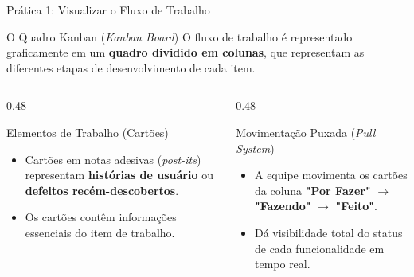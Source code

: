 \documentclass[aspectratio=169, 9pt]{beamer}
\begin{document}
\begin{frame}{Prática 1: Visualizar o Fluxo de Trabalho}
  \begin{block}{O Quadro Kanban (\textit{Kanban Board})}
    O fluxo de trabalho é representado graficamente em um \textbf{quadro dividido em colunas}, que representam as diferentes etapas de desenvolvimento de cada item.
  \end{block}

  \vspace{0.3cm}

  \begin{columns}[T]
    \begin{column}{0.48\textwidth}
      \begin{exampleblock}{Elementos de Trabalho (Cartões)}
        \begin{itemize}
          \item Cartões em notas adesivas (\textit{post-its}) representam \textbf{histórias de usuário} ou \textbf{defeitos recém-descobertos}.
          \item Os cartões contêm informações essenciais do item de trabalho.
        \end{itemize}
      \end{exampleblock}
    \end{column}

    \begin{column}{0.48\textwidth}
      \begin{alertblock}{Movimentação Puxada (\textit{Pull System})}
        \begin{itemize}
          \item A equipe movimenta os cartões da coluna \textbf{"Por Fazer"} $\rightarrow$ \textbf{"Fazendo"} $\rightarrow$ \textbf{"Feito"}.
          \item Dá visibilidade total do status de cada funcionalidade em tempo real.
        \end{itemize}
      \end{alertblock}
    \end{column}
  \end{columns}
\end{frame}
\end{document}
